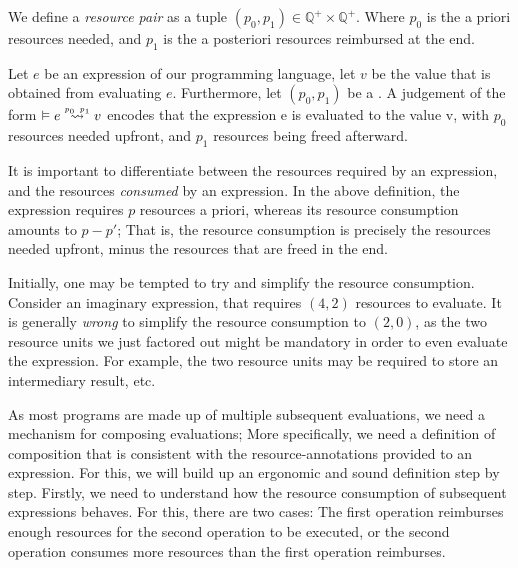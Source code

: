 \begin{definition}
   \label{def:resource-pair}
   We define a \emph{resource pair} as a tuple \((p_0, p_1) \in \mathbb{Q}^{+} \times \mathbb{Q}^{+}\). Where \(p_0\) is the a priori resources needed, and \(p_1\) is the a posteriori resources reimbursed at the end.
\end{definition}

\begin{definition}\label{def:evaluation-judgement}
   Let \(e\) be an expression of our programming language, let \(v\) be the value that is obtained from evaluating \(e\). Furthermore, let \((p_0, p_1)\) be a .
   A judgement of the form \(\evals{}{e}{v}{p_0}{p_1}\) encodes that the expression e is evaluated to the value v, with \(p_0\) resources needed upfront, and \(p_1\) resources being freed afterward.
\end{definition}

It is important to differentiate between the resources required by an expression, and the resources \emph{consumed} by an expression. In the above definition, the expression requires \(p\) resources a priori, whereas its resource consumption amounts to \(p - p'\); That is, the resource consumption is precisely the resources needed upfront, minus the resources that are freed in the end.

Initially, one may be tempted to try and simplify the resource consumption. Consider an imaginary expression, that requires \((4, 2)\) resources to evaluate. It is generally \emph{wrong} to simplify the resource consumption to \((2, 0)\), as the two resource units we just factored out might be mandatory in order to even evaluate the expression. For example, the two resource units may be required to store an intermediary result, etc. 

As most programs are made up of multiple subsequent evaluations, we need a mechanism for composing evaluations; More specifically, we need a definition of composition that is consistent with the resource-annotations provided to an expression.
For this, we will build up an ergonomic and sound definition step by step. Firstly, we need to understand how the resource consumption of subsequent expressions behaves. For this, there are two cases: The first operation reimburses enough resources for the second operation to be executed, or the second operation consumes more resources than the first operation reimburses. 

